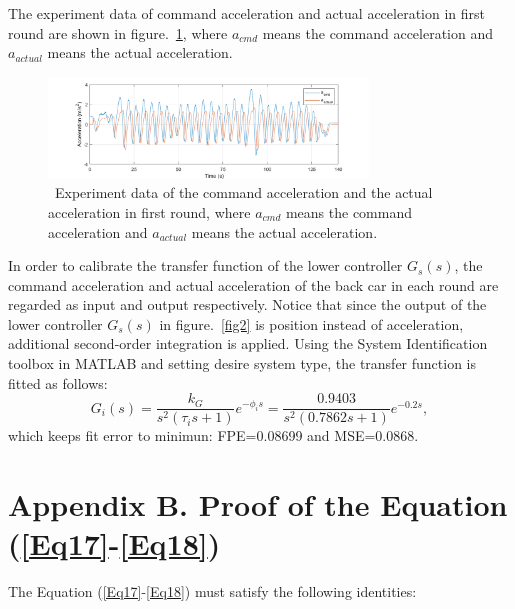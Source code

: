 \documentclass[journal]{IEEEtran}
\begin{document}
The experiment data of command acceleration and actual acceleration in first round are shown in figure.~\ref{fig14}, where $a_{cmd}$ means the command acceleration and $a_{actual}$ means the actual acceleration.

\begin{figure}
  \centering
  \includegraphics[width=8.5cm]{figs/fig14.png}
  \caption{~Experiment data of the command acceleration and the actual acceleration in first round, where $a_{cmd}$ means the command acceleration and $a_{actual}$ means the actual acceleration.}
  \label{fig14}
\end{figure}

In order to calibrate the transfer function of the lower controller $G_s (s)$, the command acceleration and actual acceleration of the back car in each round are regarded as input and output respectively. Notice that since the output of the lower controller $G_s (s)$ in figure.~\ref{fig2} is position instead of acceleration, additional second-order integration is applied. Using the System Identification toolbox in MATLAB and setting desire system type, the transfer function is fitted as follows:
\begin{equation}
  G_{i}(s)=\frac{k_{G}}{s^{2}\left(\tau_{i} s+1\right)} e^{-\phi_{i} s}=\frac{0.9403}{s^{2}(0.7862 s+1)} e^{-0.2 s},
\end{equation}
which keeps fit error to minimun: FPE=0.08699 and MSE=0.0868.

\section*{Appendix B. Proof of the Equation (\ref{Eq17}-\ref{Eq18})}
\label{AppendixB}

The Equation (\ref{Eq17}-\ref{Eq18}) must satisfy the following identities:
\end{document}
